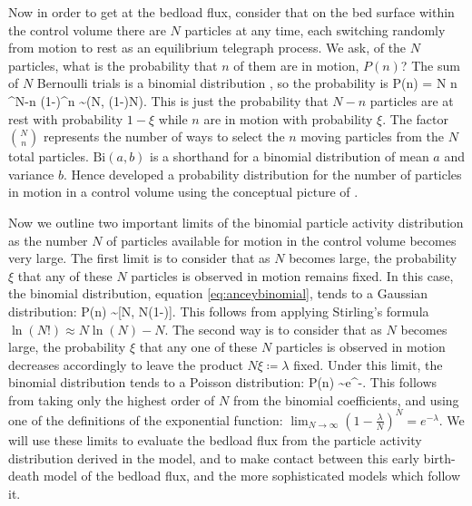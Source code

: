 Now in order to get at the bedload flux, consider that on the bed surface within the control volume there are $N$ particles at any time, each switching randomly from motion to rest as an equilibrium telegraph process. 
We ask, of the $N$ particles, what is the probability that $n$ of them are in motion, $P(n)$?
The sum of $N$ Bernoulli trials is a binomial distribution \citep{Feller1968}, so the probability is
\be P(n) = {N \choose n} \xi^{N-n} (1-\xi)^n \sim {}(\xi N, \xi(1-\xi)N). \label{eq:anceybinomial}\ee
This is just the probability that $N-n$ particles are at rest with probability $1-\xi$ while $n$ are in motion with probability $\xi$. 
The factor ${N \choose n}$ represents the number of ways to select the $n$ moving particles from the $N$ total particles.
$\text{Bi}(a,b)$ is a shorthand for a binomial distribution of mean $a$ and variance $b$. 
Hence \citet{Ancey2006} developed a probability distribution for the number of particles in motion in a control volume using the conceptual picture of \citet{Einstein1950}.

Now we outline two important limits of the binomial particle activity distribution as the number $N$ of particles available for motion in the control volume becomes very large.
The first limit is to consider that as $N$ becomes large, the probability $\xi$ that any of these $N$ particles is observed in motion remains fixed. 
In this case, the binomial distribution, equation \ref{eq:anceybinomial}, tends to a Gaussian distribution: 
\be P(n) \sim {}[N\xi, N\xi(1-\xi)]. \label{eq:normaldistflux} \ee
This follows from applying Stirling's formula $\ln(N!) \approx N\ln(N)-N$. 
The second way is to consider that as $N$ becomes large, the probability $\xi$ that any one of these $N$ particles is observed in motion decreases accordingly to leave the product $N\xi \coloneqq \lambda$ fixed. 
Under this limit, the binomial distribution tends to a Poisson distribution: 
\be P(n) \sim {}e^{-\lambda}. \label{eq:ancey2006poissonlimit}\ee
This follows from taking only the highest order of $N$ from the binomial coefficients, and using one of the definitions of the exponential function: $\lim_{N\rightarrow \infty}(1-\frac{\lambda}{N})^{N} = e^{-\lambda}.$
We will use these limits to evaluate the bedload flux from the particle activity distribution derived in the \citet{Ancey2006} model, and to make contact between this early birth-death model of the bedload flux, and the more sophisticated models which follow it. 

